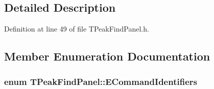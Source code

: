 \subsection{Detailed Description}


Definition at line 49 of file TPeakFindPanel.h.



\subsection{Member Enumeration Documentation}
\subsubsection[{ECommandIdentifiers}]{\setlength{\rightskip}{0pt plus 5cm}enum {\bf TPeakFindPanel::ECommandIdentifiers}\hspace{0.3cm}{\ttfamily  [protected]}}\label{classTPeakFindPanel_afbe6618ca662c0c51313b180272a7e06}
